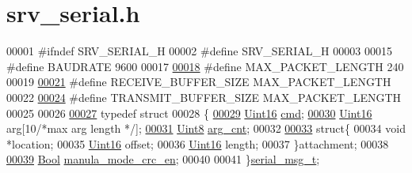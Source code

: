 \hypertarget{a00031_source}{\section{srv\+\_\+serial.\+h}
\label{a00031_source}
}

\begin{DoxyCode}
00001 \textcolor{preprocessor}{#ifndef SRV\_SERIAL\_H}
00002 \textcolor{preprocessor}{#define SRV\_SERIAL\_H}
00003 
00015 \textcolor{preprocessor}{#define BAUDRATE                 9600}
00017 
\hypertarget{a00031_source_l00018}{}\hyperlink{a00031_a973c680573b37fc359fc68d0707da355}{00018} \textcolor{preprocessor}{#define MAX\_PACKET\_LENGTH        240}
00019                            
\hypertarget{a00031_source_l00021}{}\hyperlink{a00031_aa49ab378520c95fea987f93a7f3c9abf}{00021} \textcolor{preprocessor}{#define RECEIVE\_BUFFER\_SIZE      MAX\_PACKET\_LENGTH}
00022 
\hypertarget{a00031_source_l00024}{}\hyperlink{a00031_aef714b16a48390956c10e8aa18d156b8}{00024} \textcolor{preprocessor}{#define TRANSMIT\_BUFFER\_SIZE     MAX\_PACKET\_LENGTH}
00025 
00026 
\hypertarget{a00031_source_l00027}{}\hyperlink{a00031}{00027} \textcolor{keyword}{typedef} \textcolor{keyword}{struct }
00028 \{
\hypertarget{a00031_source_l00029}{}\hyperlink{a00031_a13c351e37c82b2434e5ce4421012ffd6}{00029}       \hyperlink{a00072_a59a9f6be4562c327cbfb4f7e8e18f08b}{Uint16} \hyperlink{a00031_a13c351e37c82b2434e5ce4421012ffd6}{cmd};
\hypertarget{a00031_source_l00030}{}\hyperlink{a00031_af7d6f762438c80072bd9dc0e4dd4ae1e}{00030}       \hyperlink{a00072_a59a9f6be4562c327cbfb4f7e8e18f08b}{Uint16} arg[10\textcolor{comment}{/*max arg length */}];
\hypertarget{a00031_source_l00031}{}\hyperlink{a00031_a7b79f40e2eeec288091afd340bf8f591}{00031}       \hyperlink{a00072_af84840501dec18061d18a68c162a8fa2}{Uint8}  \hyperlink{a00031_a7b79f40e2eeec288091afd340bf8f591}{arg\_cnt};
00032 
\hypertarget{a00031_source_l00033}{}\hyperlink{a00031}{00033}       \textcolor{keyword}{struct}\{
00034       \textcolor{keywordtype}{void}         *location;
00035       \hyperlink{a00072_a59a9f6be4562c327cbfb4f7e8e18f08b}{Uint16}        offset;
00036       \hyperlink{a00072_a59a9f6be4562c327cbfb4f7e8e18f08b}{Uint16}        length;
00037       \}attachment;
00038 
\hypertarget{a00031_source_l00039}{}\hyperlink{a00031_ac93426bd9983c1934abcbeddbb64e306}{00039}       \hyperlink{a00072_a253b248072cfc8bd812c69acd0046eed}{Bool} \hyperlink{a00031_ac93426bd9983c1934abcbeddbb64e306}{manula\_mode\_crc\_en};
00040 
00041 \}\hyperlink{a00031_d3/d4f/a00761}{serial\_msg\_t};

\end{DoxyCode}
